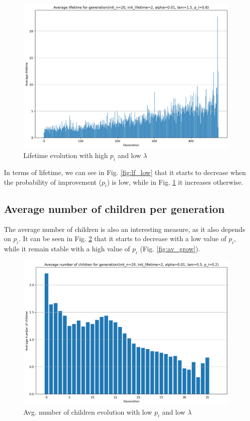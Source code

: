 \documentclass[conference]{IEEEtran}
\begin{document}
        \begin{figure}[!ht]
            \centering
            \includegraphics[width=\columnwidth]{media/in_p_20_in_lt_2_a_0.01_l_1.5_p_i_0.8/lf.png}
            \caption[short]{Lifetime evolution with high $p_i$ and low $\lambda$}
            \label{fig:lf_grow}
        \end{figure}

        In terms of lifetime, we can see in Fig. \ref{fig:lf_low} that it starts to decrease when the probability of improvement ($p_i$) is low, while in Fig. \ref{fig:lf_grow} it increases otherwise.

    \subsection{Average number of children per generation}
        The average number of children is also an interesting measure, as it also depends on $p_i$.
        It can be seen in Fig. \ref{fig:av_low} that it starts to decrease with a low value of $p_i$, while it remain stable with a high value of $p_i$ (Fig. \ref{fig:av_grow}).

        \begin{figure}[!ht]
            \centering
            \includegraphics[width=\columnwidth]{media/in_p_20_in_lt_2_a_0.01_l_0.5_p_i_0.2/av.png}
            \caption[short]{Avg. number of children evolution with low $p_i$ and low $\lambda$}
            \label{fig:av_low}
        \end{figure}
\end{document}
